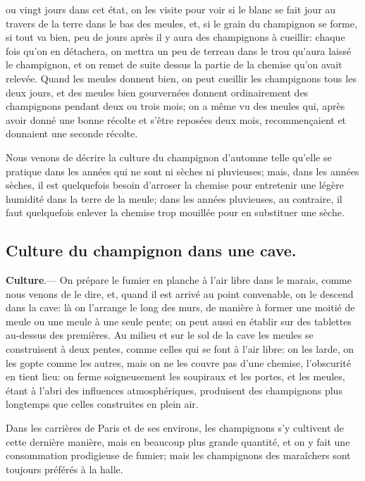 \documentclass[10pt,a4paper]{book}
\begin{document}
ou vingt jours dans cet état, on les visite pour voir si le blanc se fait jour au travers de la terre dans le bas des meules, et, si le grain du champignon se forme, si tout va bien, peu de jours après il y aura des champignons à cueillir: chaque fois qu'on en détachera, on mettra un peu de terreau dans le trou qu'aura laissé le champignon, et on remet de suite dessus la partie de la chemise qu'on avait relevée. Quand les meules donnent bien, on peut cueillir les champignons tous les deux jours, et des meules bien gourvernées donnent ordinairement des champignons pendant deux ou trois mois; on a même vu des meules qui, après avoir donné une bonne récolte et s'être reposées deux mois, recommençaient et donnaient une seconde récolte.

Nous venons de décrire la culture du champignon d'automne telle qu'elle se pratique dans les années qui ne sont ni sèches ni pluvieuses; mais, dans les années sèches, il est quelquefois besoin d'arroser la chemise pour entretenir une légère humidité dans la terre de la meule; dans les années pluvieuses, au contraire, il faut quelquefois enlever la chemise trop mouillée pour en substituer une sèche.

\subsection{Culture du champignon dans une cave.}

\textbf{Culture}.--- On prépare le fumier en planche à l'air libre dans le marais, comme nous venons de le dire, et, quand il est arrivé au point convenable, on le descend dans la cave: là on l'arrange le long des murs, de manière à former une moitié de meule ou une meule à une seule pente; on peut aussi en établir sur des tablettes au-dessus des premières. Au milieu et sur le sol de la cave les meules se construisent à deux pentes, comme celles qui se font à l'air libre: on les larde, on les gopte comme les autres, mais on ne les couvre pas d'une chemise, l'obscurité en tient lieu: on ferme soigneusement les soupiraux et les portes, et les meules, étant à l'abri des influences atmosphériques, produisent des champignons plus longtemps que celles construites en plein air.

Dans les carrières de Paris et de ses environs, les champignons s'y cultivent de cette dernière manière, mais en beaucoup plus grande quantité, et on y fait une consommation prodigieuse de fumier; mais les champignons des maraîchers sont toujours préférés à la halle.
\end{document}

